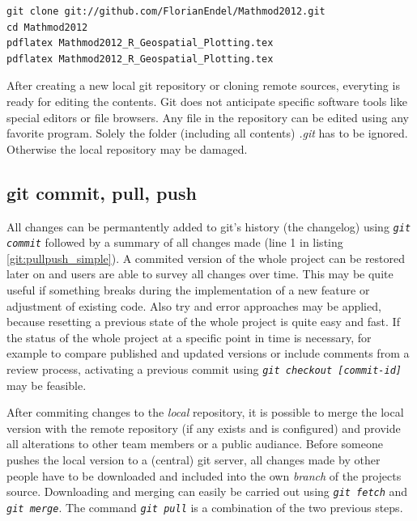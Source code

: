 \documentclass{ifacconf}
\begin{document}
\begin{lstlisting}
git clone git://github.com/FlorianEndel/Mathmod2012.git
cd Mathmod2012
pdflatex Mathmod2012_R_Geospatial_Plotting.tex
pdflatex Mathmod2012_R_Geospatial_Plotting.tex
\end{lstlisting}

After creating a new local git repository or cloning remote sources, everyting is ready for
editing the contents. Git does not anticipate specific software tools like special editors or file browsers. Any file in 
the repository can be edited using any favorite program. Solely the folder (including all contents)
\textit{.git} has to be ignored. Otherwise the local repository may be damaged.

\subsection{git commit, pull, push}
All changes can be permantently 
added to git's history (the changelog) using \textit{\lstinline!git commit!} followed by a 
summary of all changes made (line 1 in listing \ref{git:pullpush_simple}). 
A commited version of the whole project can be restored later on and users are able to
survey all changes over time. This may be
quite useful if something breaks during the implementation of a new feature or adjustment of existing code.
Also try and error approaches may be applied, because resetting a previous state of the whole project is 
quite easy and fast. If the status of the whole project at a specific point in time is necessary, for example
to compare published and updated versions or include comments from a review process, activating  
a previous commit using \textit{\lstinline!git checkout [commit-id]!} may be feasible.

After commiting changes to the \textit{local} repository, it is possible to merge the local version 
with the remote repository (if any exists and is configured) and provide all alterations to other team members or a
public audiance. Before someone pushes the local version to a (central) git server, all changes made
by other people have to be downloaded and included into the own \textit{branch} of the projects source.
Downloading and merging can easily be carried out using \textit{\lstinline!git fetch!} and 
\textit{\lstinline!git merge!}. The command \textit{\lstinline!git pull!} is a combination of
the two previous steps.
\end{document}
